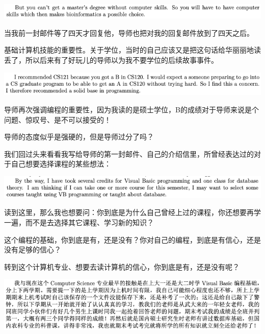\documentclass[9pt, b5paper]{article}
\begin{document}
\begin{center}
\includegraphics[width=.9\linewidth]{./pic/backups_plans_20210421_092635.png}
\end{center}

当我前一封邮件等了四天才回复他，导师也把对我的回复邮件放到了四天之后。 

基础计算机技能的重要性。关于学位，当时的自己应该又是把这句话给华丽丽地读丢了，所以后来有了好玩儿的导师以为我不要学位的后续故事事件。 

\begin{center}
\includegraphics[width=.9\linewidth]{./pic/backups_plans_20210421_092842.png}
\end{center}

导师再次强调编程的重要性，因为我读的是硕士学位，B的成绩对于导师来说是个问题、惊叹号、是不可以接受的！

导师的态度似乎是强硬的，但是导师过分了吗？

我们回过头来看看我写给导师的第一封邮件、自己的介绍信里，所曾经表达过的对于自己想要选择课程的某些想法：

\begin{center}
\includegraphics[width=.9\linewidth]{./pic/backups_plans_20210420_114525.png}
\end{center}

读到这里，那么我也想要问：你到底是为什么自己曾经上过的课程，你还想要再学一遍，而不是去选择其它课程、学习新的知识？

这个编程的基础，你到底是有，还是没有？你对自己的编程，到底是有信心，还是没有足够的信心？

转到这个计算机专业、想要去读计算机的信心，你到底是有，还是没有呢？

\begin{center}
\includegraphics[width=.9\linewidth]{./pic/backups_plans_20210421_134744.png}
\end{center}
\end{document}
